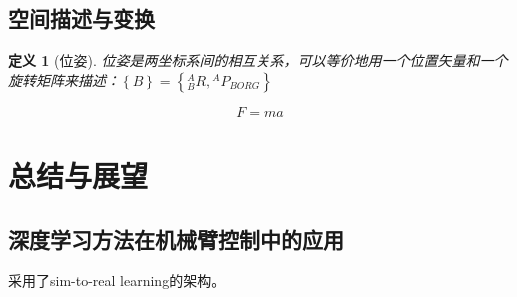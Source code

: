 \documentclass[a4paper,12pt]{report}
\newtheorem{definition}{定义}
\begin{document}
\section{空间描述与变换}

\begin{definition}[位姿]
    位姿是两坐标系间的相互关系，可以等价地用一个位置矢量和一个旋转矩阵来描述：$\left\{ B \right\} = \left\{ {{}_B^AR,{}^A{P_{BORG}}} \right\}$
\end{definition}

\begin{equation}
    F=ma
\end{equation}

\chapter{总结与展望}

\section{深度学习方法在机械臂控制中的应用}

\cite{wilson2019learning}采用了sim-to-real learning的架构。



\printbibliography

\end{document}

